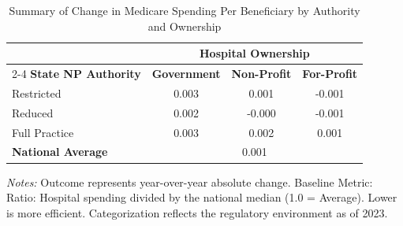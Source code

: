 \begin{table}[htbp]
    \centering
    \caption{Summary of Change in Medicare Spending Per Beneficiary by Authority and Ownership}
    \label{tab:d_mspb_score_own}
    \vspace{0.2cm}
    \begin{tabular}{lccc}
        \toprule
        & \multicolumn{3}{c}{\textbf{Hospital Ownership}} \\
        \cmidrule(lr){2-4}
        \textbf{State NP Authority} & \textbf{Government} & \textbf{Non-Profit} & \textbf{For-Profit} \\
        \midrule
        Restricted & 0.003 & 0.001 & -0.001 \\
        Reduced & 0.002 & -0.000 & -0.001 \\
        Full Practice & 0.003 & 0.002 & 0.001 \\
        \midrule
        \textbf{National Average} & \multicolumn{3}{c}{0.001} \\
        \bottomrule
    \end{tabular}
    \vspace{0.1cm}
    \begin{minipage}{0.85\textwidth}
        \footnotesize \textit{Notes:} Outcome represents year-over-year absolute change. Baseline Metric: Ratio: Hospital spending divided by the national median (1.0 = Average). Lower is more efficient. Categorization reflects the regulatory environment as of 2023.
    \end{minipage}
\end{table}